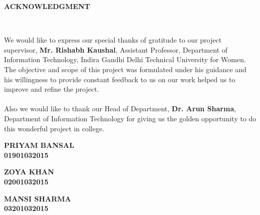 \documentclass[a4paper,11pt]{article}
\begin{document}
\newpage
{\LARGE \bfseries ACKNOWLEDGMENT}
\vspace*{5mm}
\medskip\\
 \begin{spacing}{1.5}
    We would like to express our special thanks of gratitude to our project supervisor, \textbf{Mr. Rishabh Kaushal}, Assistant Professor, Department of Information Technology, Indira Gandhi Delhi Technical University for Women. The objective and scope of this project was
    formulated under his guidance and his willingness to
    provide constant feedback to us on our work helped us to
    improve and refine the project. \\
    \\
    Also we would like to thank our Head of Department, \textbf{Dr. Arun Sharma}, Department of Information Technology for giving us the golden opportunity to do this wonderful project in college. 
    
  \vspace*{2.5cm}
{\hspace*{\fill} {\textbf{PRIYAM BANSAL\\\hspace*{\fill}01901032015}}}

 \vspace*{0.1cm}
{\hspace*{\fill} {\textbf{ZOYA KHAN\\\hspace*{\fill}02001032015}}}
 
 
 \vspace*{0.1cm}
{\hspace*{\fill} {\textbf{MANSI SHARMA\\\hspace*{\fill}03201032015}}}
\end{spacing}
\end{document}
